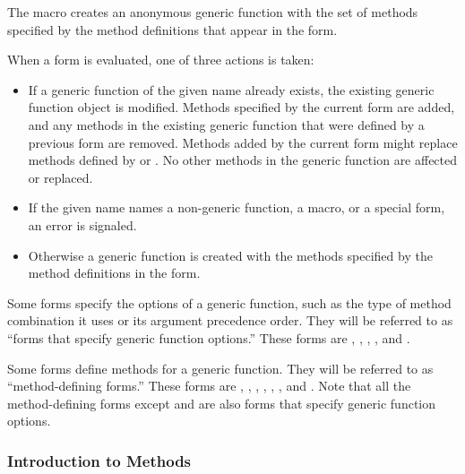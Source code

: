 The  macro creates an anonymous generic
function with the set of methods specified by the method definitions that appear
in the  form.

When a  form is evaluated, one of three actions
is taken:

\begin{itemize}

\item  If a generic function of the given name already exists,
the existing generic function object is modified.  Methods specified
by the current  form are added, and any methods in the
existing generic function that were defined by a previous 
 form are removed.  Methods added by the current 
 form might replace methods defined by  or
.  No other methods in the generic function are affected
or replaced.

\item  If the given name names a non-generic function, a
macro, or a special form, an error is signaled.

\item  Otherwise a generic function is created with the
methods specified by the method definitions in the 
form.

\end{itemize}

Some forms specify the options of a generic function,
such as the type of method combination it uses or its argument
precedence order.  They will be referred to as ``forms that
specify generic function options.'' These forms are ,
, , , and
.

Some forms define methods for a generic function.  They will be
referred to as ``method-defining forms.'' These forms are 
, , , 
, , , and
. Note that all the method-defining forms except 
 and 
are also forms that specify generic function options.

\subsubsection{Introduction to Methods}
\label{Introduction-to-Methods-SECTION}

